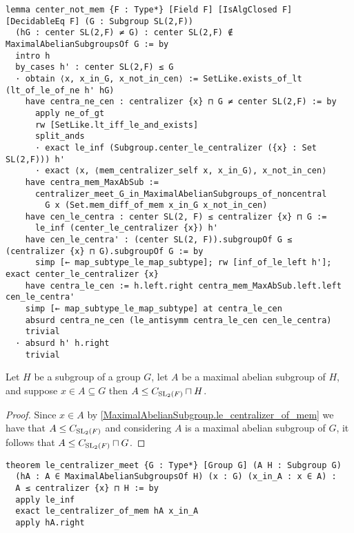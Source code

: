\begin{footnotesize}
\begin{verbatim}
lemma center_not_mem {F : Type*} [Field F] [IsAlgClosed F] [DecidableEq F] (G : Subgroup SL(2,F))
  (hG : center SL(2,F) ≠ G) : center SL(2,F) ∉ MaximalAbelianSubgroupsOf G := by
  intro h
  by_cases h' : center SL(2,F) ≤ G
  · obtain ⟨x, x_in_G, x_not_in_cen⟩ := SetLike.exists_of_lt (lt_of_le_of_ne h' hG)
    have centra_ne_cen : centralizer {x} ⊓ G ≠ center SL(2,F) := by
      apply ne_of_gt
      rw [SetLike.lt_iff_le_and_exists]
      split_ands
      · exact le_inf (Subgroup.center_le_centralizer ({x} : Set SL(2,F))) h'
      · exact ⟨x, ⟨mem_centralizer_self x, x_in_G⟩, x_not_in_cen⟩
    have centra_mem_MaxAbSub :=
      centralizer_meet_G_in_MaximalAbelianSubgroups_of_noncentral
        G x (Set.mem_diff_of_mem x_in_G x_not_in_cen)
    have cen_le_centra : center SL(2, F) ≤ centralizer {x} ⊓ G :=
      le_inf (center_le_centralizer {x}) h'
    have cen_le_centra' : (center SL(2, F)).subgroupOf G ≤ (centralizer {x} ⊓ G).subgroupOf G := by
      simp [← map_subtype_le_map_subtype]; rw [inf_of_le_left h']; exact center_le_centralizer {x}
    have centra_le_cen := h.left.right centra_mem_MaxAbSub.left.left cen_le_centra'
    simp [← map_subtype_le_map_subtype] at centra_le_cen
    absurd centra_ne_cen (le_antisymm centra_le_cen cen_le_centra)
    trivial
  · absurd h' h.right
    trivial
\end{verbatim}
\end{footnotesize}



\begin{lemma}
  \label{MaximalAbelianSubgroup.le_centralizer_meet}
  \leanok
  Let $H$ be a subgroup of a group $G$, let $A$ be a maximal abelian subgroup of $H$, and suppose $x \in A \subseteq G$ then 
  $A \le C_{\operatorname{SL}_2(F)} \sqcap H$.
\end{lemma}
\begin{proof}
  \leanok

  Since $x \in A$ by \ref{MaximalAbelianSubgroup.le_centralizer_of_mem} we have that $A \le C_{\operatorname{SL}_2(F)}$ and considering
  $A$ is a maximal abelian subgroup of $G$, it follows that $A \le C_{\operatorname{SL}_2(F)} \sqcap G$.
\end{proof}
\begin{footnotesize}
\begin{verbatim}
theorem le_centralizer_meet {G : Type*} [Group G] (A H : Subgroup G)
  (hA : A ∈ MaximalAbelianSubgroupsOf H) (x : G) (x_in_A : x ∈ A) :
  A ≤ centralizer {x} ⊓ H := by
  apply le_inf
  exact le_centralizer_of_mem hA x_in_A
  apply hA.right
\end{verbatim}
\end{footnotesize}

